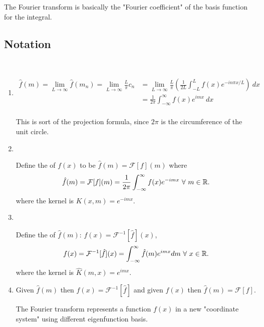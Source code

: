 \documentclass[class=article,crop=false]{standalone}
\begin{document}
\begin{intuition}
	The Fourier transform is basically the "Fourier coefficient" of the basis function for the integral.
\end{intuition}

\subsection{Notation}
~\begin{enumerate}[label=\arabic*)]
	\item 
		\begin{align*}
			\hat{ f}(m) = \lim_{ L \to \infty} \hat{ f}(m_n) = \lim_{ L \to \infty} \frac{L}{\pi} c_n &= \lim_{ L \to \infty} \frac{L}{\pi} \left( \frac{1}{2L} \int_{-L}^{L} f(x) e^{ - i n\pi x / L}   \right) \ dx \\
														  &= \frac{1}{2\pi} \int_{-\infty}^{\infty} f(x) e^{   i m x }  \ dx  \\
		\end{align*}
		\begin{intuition}
			This is sort of the projection formula, since $ 2\pi$ is the circumference of the unit circle.
		\end{intuition}
	\item 
		~\begin{defn} 
			Define the  of $ f(x)$ to be  $ \hat{ f}(m) = \mathcal{F}[f](m)$ where
		\[
			\hat{ f}(m) = \mathcal{F}[f](m) = \frac{1}{2\pi } \int_{-\infty}^{\infty} f(x) e^{ -  i m x } \ \forall \ m \in \rr  
		.\] 
	where the kernel is $ K(x,m)=e^{-imx}$. 
\end{defn}
	\item 
		~\begin{defn}
		Define the  of $ \hat{ f}(m)$: $ f(x) = \mathcal{F}^{-1} [\hat{ f}](x)$,
		\[
			f(x) = \mathcal{F}^{-1} [\hat{ f}](x) = \int_{-\infty}^{\infty} \hat{ f}(m) e^{imx} dm \ \forall \ x \in \mathbb{R}  
		.\] 
		where the kernel is $ \hat{ K}(m,x) = e^{imx}$.
	        \end{defn}
	\item Given $ \hat{ f}(m)$ then $ f(x) =\mathcal{F} ^{-1}[\hat{ f}]$ and given $ f(x)$ then  $ \hat{ f}(m) = \mathcal{F}[f]$.
		\begin{intuition}
			The Fourier transform represents a function $ f(x)$ in a new "coordinate system" using different eigenfunction basis. 
		\end{intuition}
\end{enumerate}
\end{document}
